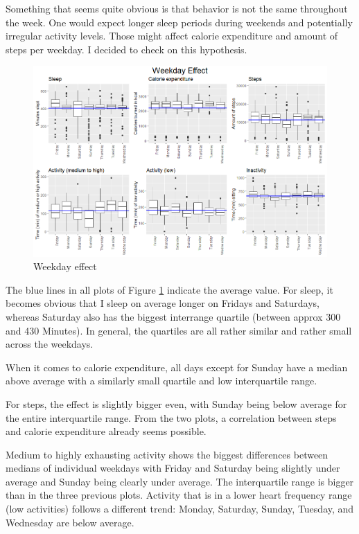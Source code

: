 \documentclass[
]{article}
\begin{document}
Something that seems quite obvious is that behavior is not the same
throughout the week. One would expect longer sleep periods during
weekends and potentially irregular activity levels. Those might affect
calorie expenditure and amount of steps per weekday. I decided to check
on this hypothesis.

\begin{figure}
\includegraphics[width=1\linewidth]{Weekday_effect_fitbit} \caption{Weekday effect}\label{fig:weekday_effect}
\end{figure}

The blue lines in all plots of Figure \ref{fig:weekday_effect} indicate
the average value. For sleep, it becomes obvious that I sleep on average
longer on Fridays and Saturdays, whereas Saturday also has the biggest
interrange quartile (between approx 300 and 430 Minutes). In general,
the quartiles are all rather similar and rather small across the
weekdays.

When it comes to calorie expenditure, all days except for Sunday have a
median above average with a similarly small quartile and low
interquartile range.

For steps, the effect is slightly bigger even, with Sunday being below
average for the entire interquartile range. From the two plots, a
correlation between steps and calorie expenditure already seems
possible.

Medium to highly exhausting activity shows the biggest differences
between medians of individual weekdays with Friday and Saturday being
slightly under average and Sunday being clearly under average. The
interquartile range is bigger than in the three previous plots. Activity
that is in a lower heart frequency range (low activities) follows a
different trend: Monday, Saturday, Sunday, Tuesday, and Wednesday are
below average.
\end{document}
